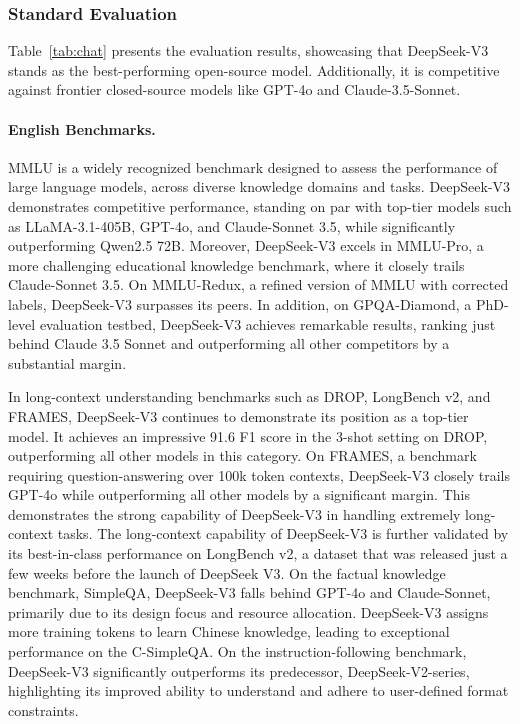 \documentclass[11pt, a4paper, logo, copyright, nonumbering]{deepseek}
\newcommand{\dsvii}{DeepSeek-V2}
\newcommand{\dsviii}{DeepSeek-V3}
\begin{document}
\begin{CJK*}{UTF8}{gbsn}


\subsubsection{Standard Evaluation}

Table~\ref{tab:chat} presents the evaluation results, showcasing that \dsviii{} stands as the best-performing open-source model. 
Additionally, it is competitive against frontier closed-source models like GPT-4o and Claude-3.5-Sonnet. 

\paragraph{English Benchmarks.}
MMLU is a widely recognized benchmark designed to assess the performance of large language models, across diverse knowledge domains and tasks. 
\dsviii{} demonstrates competitive performance, standing on par with top-tier models such as LLaMA-3.1-405B, GPT-4o, and Claude-Sonnet 3.5, while significantly outperforming Qwen2.5 72B. 
Moreover, \dsviii{} excels in MMLU-Pro, a more challenging educational knowledge benchmark, where it closely trails Claude-Sonnet 3.5. 
On MMLU-Redux, a refined version of MMLU with corrected labels, \dsviii{} surpasses its peers. 
In addition, on GPQA-Diamond, a PhD-level evaluation testbed, \dsviii{} achieves remarkable results, ranking just behind Claude 3.5 Sonnet and outperforming all other competitors by a substantial margin.

In long-context understanding benchmarks such as DROP, LongBench v2, and FRAMES, \dsviii{} continues to demonstrate its position as a top-tier model. 
It achieves an impressive 91.6 F1 score in the 3-shot setting on DROP, outperforming all other models in this category. 
On FRAMES, a benchmark requiring question-answering over 100k token contexts, \dsviii{} closely trails GPT-4o while outperforming all other models by a significant margin. 
This demonstrates the strong capability of \dsviii{} in handling extremely long-context tasks. 
The long-context capability of \dsviii{} is further validated by its best-in-class performance on LongBench v2, a dataset that was released just a few weeks before the launch of DeepSeek V3. 
On the factual knowledge benchmark, SimpleQA, \dsviii{} falls behind GPT-4o and Claude-Sonnet, primarily due to its design focus and resource allocation. 
\dsviii{} assigns more training tokens to learn Chinese knowledge, leading to exceptional performance on the C-SimpleQA. 
On the instruction-following benchmark, \dsviii{} significantly outperforms its predecessor, \dsvii{}-series, highlighting its improved ability to understand and adhere to user-defined format constraints.


\end{CJK*}
\end{document}
